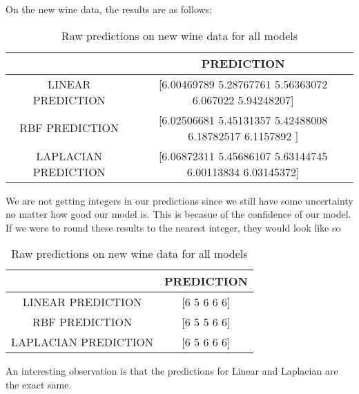 \documentclass[11pt]{amsart}
\begin{document}
On the new wine data, the results are as follows:
\begin{table}[H]
    \centering
    \begin{tabular}{| c | c |}
         \hline
         & PREDICTION \\ \hline
         LINEAR PREDICTION & [6.00469789 5.28767761 5.56363072 6.067022   5.94248207]  \\ \hline
         RBF PREDICTION & [6.02506681 5.45131357 5.42488008 6.18782517 6.1157892 ]  \\ \hline
         LAPLACIAN PREDICTION & [6.06872311 5.45686107 5.63144745 6.00113834 6.03145372]  \\ \hline
    \end{tabular}
    \caption{Raw predictions on new wine data for all models}
    \label{tab:RawPred}
\end{table}

We are not getting integers in our predictions since we still have some uncertainty no matter how good our model is. 
This is becasue of the confidence of our model. If we were to round these results to the nearest integer, they would look like so

\begin{table}[H]
    \centering
    \begin{tabular}{| c | c |}
         \hline
         & PREDICTION \\ \hline
         LINEAR PREDICTION & [6 5 6 6 6]  \\ \hline
         RBF PREDICTION & [6 5 5 6 6]  \\ \hline
         LAPLACIAN PREDICTION & [6 5 6 6 6]  \\ \hline
    \end{tabular}
    \caption{Raw predictions on new wine data for all models}
    \label{tab:RoundPred}
\end{table}

An interesting observation is that the predictions for Linear and Laplacian are the exact same.


\end{document}
